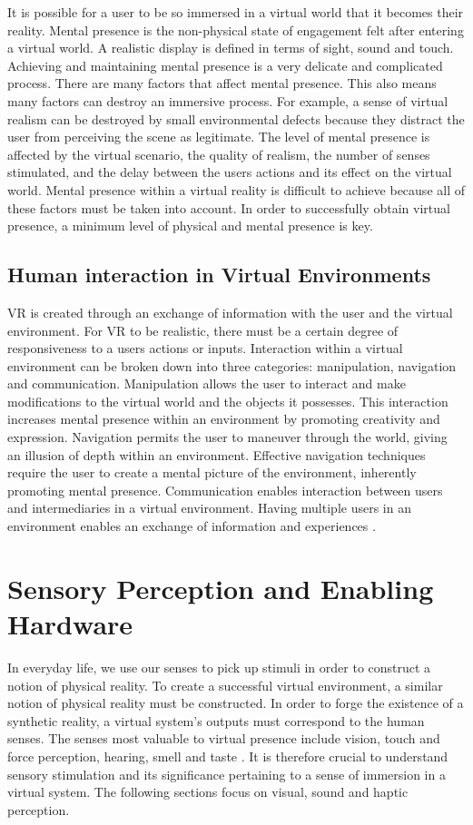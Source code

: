 \documentclass[12pt]{article}
\begin{document}
It is possible for a user to be so immersed in a virtual world that it becomes their reality. Mental presence is the non-physical state of engagement felt after entering a virtual world. A realistic display is defined in terms of sight, sound and touch. Achieving and maintaining mental presence is a very delicate and complicated process. There are many factors that affect mental presence. This also means many factors can destroy an immersive process. For example, a sense of virtual realism can be destroyed by small environmental defects because they distract the user from perceiving the scene as legitimate. The level of mental  presence is affected by the virtual scenario, the quality of realism, the number of senses stimulated, and the delay between the users actions and its effect on the virtual world. Mental presence within a virtual reality is difficult to achieve because all of these factors must be taken into account. In order to  successfully obtain virtual presence, a minimum level of physical and mental presence is key.  

\subsection{Human interaction in Virtual Environments}
 VR is created through an exchange of information with the user and the virtual environment. For VR to be realistic, there must be a certain degree of responsiveness to a users actions or inputs. Interaction within a virtual environment can be broken down into three categories: manipulation, navigation and communication. 
Manipulation allows the user to interact and make modifications to the virtual world and the objects it possesses. This interaction increases mental presence within an environment by promoting creativity and expression. Navigation permits the user to maneuver through the world, giving an illusion of depth within an environment. Effective navigation techniques require the user to create a mental picture of the environment, inherently promoting mental presence. Communication enables interaction between users and intermediaries in a virtual environment. Having multiple users in an environment enables an exchange of information and experiences \cite{mihelj}.



\section{Sensory Perception and Enabling Hardware} %
In everyday life, we use our senses to pick up stimuli in order to construct a notion of physical reality. To create a successful virtual environment, a similar notion of physical reality must be constructed. In order to forge the existence of a synthetic reality, a virtual system's outputs must correspond to the human senses. The senses most valuable to virtual presence include vision, touch and force perception, hearing, smell and taste \cite{gobbetti}. %
It is therefore crucial to understand sensory stimulation and its significance pertaining to a sense of immersion in a virtual system. The following sections focus on visual, sound and haptic perception.
\end{document}

